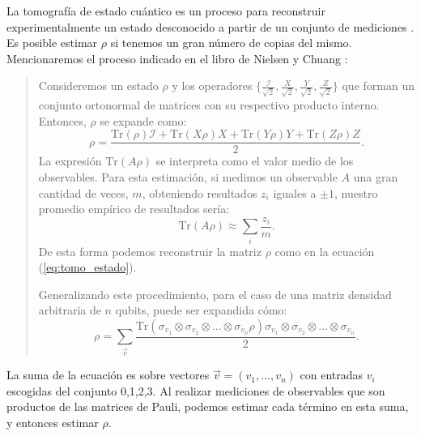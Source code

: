 \documentclass[letterpaper,12pt]{thesisECFM}
\theoremstyle{plain}
\theoremstyle{definition}
\theoremstyle{definition}
\theoremstyle{remark}
\newcommand{\1}{\mathbb{1}}
\begin{document}
La tomografía de estado cuántico es un proceso para reconstruir
experimentalmente un estado desconocido a partir de un conjunto de mediciones
\cite{nielsen_chuang_2011}. Es posible estimar $\rho$ si tenemos un gran número de copias del mismo. Mencionaremos el proceso
indicado en el libro de Nielsen y Chuang \cite{nielsen_chuang_2011}:
\begin{quote}
Consideremos un estado $\rho$ y los operadores $\{\frac{\mathcal{I}}{\sqrt{2}},
\frac{X}{\sqrt{2}},  \frac{Y}{\sqrt{2}},  \frac{Z}{\sqrt{2}} \} $ que forman un
conjunto ortonormal de matrices con su respectivo producto interno. Entonces,
$\rho$ se expande como:
\begin{equation}
\label{eq:tomo_estado}
    \rho = \frac{\text{Tr}(\rho)\mathcal{I} + \text{Tr}(X\rho)X  + \text{Tr}(Y\rho)Y + \text{Tr}(Z\rho)Z}  {2}.
\end{equation}
La expresión $\text{Tr}(A\rho)$ se interpreta como el valor medio de los observables. Para esta estimación, si medimos un observable $A$ una gran cantidad de veces, $m$, obteniendo resultados $z_i$ iguales a $\pm 1$, nuestro promedio empírico de resultados sería:
\begin{equation}
    \text{Tr}(A \rho) \approx \sum_i \frac{z_i}{m}.
\end{equation}
De esta forma podemos reconstruir la matriz $\rho$ como en la ecuación (\ref{eq:tomo_estado}).  

Generalizando este procedimiento, para el caso de una matriz densidad arbitraria de $n$ qubits, puede ser expandida cómo:
\begin{equation}
\rho = \sum_{\vec{v}} \frac{ \text{Tr}(\sigma_{v_1} \otimes \sigma_{v_2} \otimes... \otimes \sigma_{v_n} \rho ) \sigma_{v_1} \otimes \sigma_{v_2 } \otimes... \otimes \sigma_{v_n}     }{2}.
\end{equation}
\end{quote}
La suma de la ecuación es sobre vectores $\vec{v} = (v_1,..., v_n)$ con entradas $v_i$ escogidas del conjunto 0,1,2,3. Al realizar mediciones de observables que son productos de las matrices de Pauli, podemos estimar cada término en esta suma, y entonces estimar $\rho$. 
\end{document}
